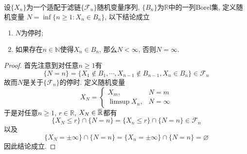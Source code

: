 \documentclass[cn, 12pt, math=mtpro2, bibstyle=apa, blue, twocol]{elegantbook}
\newcommand{\F}{\mathcal{F}}
\newcommand{\R}{\mathbb{R}}
\newcommand{\overbar}[1]{\mkern 1.5mu\overline{\mkern-1.5mu#1\mkern-1.5mu}\mkern 1.5mu}
\let\emptyset\varnothing
\begin{document}
\begin{theorem}
  设$\{X_n\}$为一个适配于滤链$\{\F_n\}$随机变量序列, $\{B_n\}$为$\R$中的一列Borel集, 定义随机变量
  $N=\inf\{n\ge1: X_n\in B_n\}$, 以下结论成立
  \begin{enumerate}[label=(\arabic*)]
  \item $N$为停时;
  \item 如果存在$n\in\mathbb{N}$使得$X_n\in B_n$, 那么$N<\infty$, 否则$N=\infty$.
  \end{enumerate}
\end{theorem}
\begin{proof}
  首先注意到对任意$n\ge1$有
  $$\{N=n\}=\{X_1\notin B_1,\cdots, X_{n-1}\notin B_{n-1}, X_n\in B_n\}\in\F_n$$
  故而$N$是关于$\{\F_n\}$的停时. 定义随机变量
  $$X_N=\begin{cases}
          X_m, & N=m \\
          \limsup X_n, & N=\infty
        \end{cases}$$
  于是对任意$n\ge1$, $r\in\R$, $X_N\in\overbar{\R}$都有
  $$\{X_N\le r\}\cap \{N=n\}=\{X_n\leq r\}\cap\{N=n\}\in\F_n$$
  以及
  $$\{X_N=\pm\infty\}\cap\{N=n\}=\{X_n=\pm\infty\}\cap\{N=n\}=\emptyset $$
  因此结论成立.
\end{proof}
\end{document}
